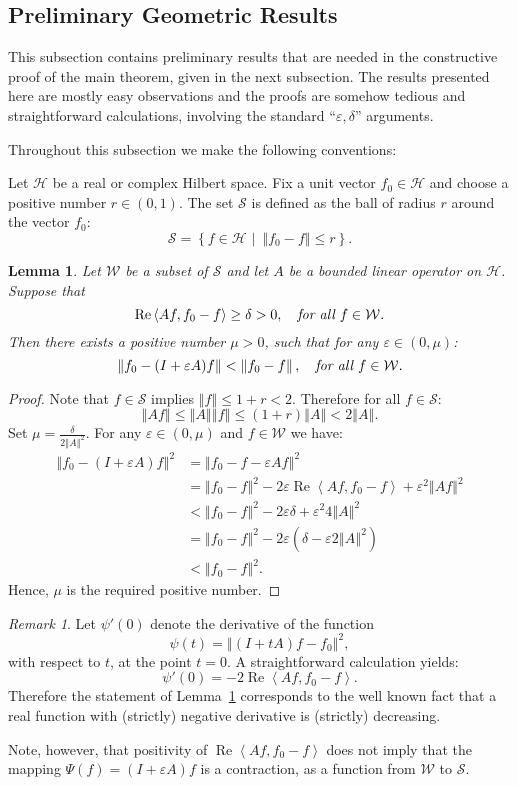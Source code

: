 \documentclass{tran-l}
\newtheorem{lem}[thm]{Lemma}
\theoremstyle{definition}
\theoremstyle{remark}
\newtheorem{rem}[thm]{Remark}
\numberwithin{equation}{subsection}
\DeclareMathOperator{\RE}{Re}
\newcommand{\eps}{\varepsilon}
\newcommand{\h}{\mathcal{H}}
\newcommand{\s}{\mathcal{S}}
\newcommand{\W}{\mathcal{W}}
\newcommand{\set}[1]{\left\{#1\right\}}
\newcommand{\seq}[1]{\left<#1\right>}
\newcommand{\norm}[1]{\left\Vert#1\right\Vert}
\begin{document}
\subsection{Preliminary Geometric Results}
This subsection contains preliminary results that are needed in the constructive proof of the main theorem, given in the next subsection. The results presented here are mostly easy observations and the proofs are somehow tedious and straightforward calculations, involving the standard ``$\eps,\delta$'' arguments.

Throughout this subsection we make the following conventions:

Let $\h$ be a real or complex Hilbert space. Fix a unit vector $f_0\in\h$ and choose a positive number $r\in(0,1)$. The set $\s$ is defined as the ball of radius $r$ around the vector $f_0$:
\[ \s = \set{f\in\h\,\,|\,\,\, \norm{f_0-f}\leq r}. \]

\begin{lem} \label{l:APPROX}
Let $\W$ be a subset of $\s$ and let $A$ be a bounded linear operator on $\h$. Suppose that
\[ \RE\seq{A{f},f_0-f}\geq\delta>0,
   \quad \text{\em for all $f\in\W$.} \]
Then there exists a positive number $\mu>0$, such that for any $\eps\in(0,\mu)$:
\[ \norm{f_0 - (I+\eps A)f} < \norm{f_0 - f},
   \quad \text{\em for all $f\in\W$.} \]
\end{lem}

\begin{proof}
Note that $f\in\s$ implies $\norm{f} \leq 1 + r < 2$. Therefore for all $f\in\s$:
\[ \norm{A{f}} \leq \norm{A}\norm{f} \leq (1+r) \norm{A} < 2\norm{A}. \]
Set $\mu=\tfrac{\delta}{2\norm{A}^2}$. For any $\eps\in(0,\mu)$ and $f\in\W$ we have:
\begin{align*}
  \norm{f_0 - (I+\eps A)f}^2 &= \norm{f_0-f - \eps A f}^2 \\ & =
  \norm{f_0-f}^2 - 2\eps\RE\seq{A{f},f_0-f} + \eps^2\norm{A{f}}^2 \\
  & < \norm{f_0-f}^2 - 2\eps\delta + \eps^2 4\norm{A}^2 \\ & =
  \norm{f_0-f}^2 - 2\eps(\delta - \eps 2\norm{A}^2) \\ & <
  \norm{f_0-f}^2.
\end{align*}
Hence, $\mu$ is the required positive number.
\end{proof}

\begin{rem}
Let $\psi'(0)$ denote the derivative of the function
\[ \psi(t)=\norm{(I+t{A})f-f_0}^2, \]
with respect to $t$, at the point $t=0$. A straightforward calculation yields:
\[ \psi'(0)=-2\RE\seq{A{f},f_0-f}. \]
Therefore the statement of Lemma~\ref{l:APPROX} corresponds to the well known fact that a real function with (strictly) negative derivative is (strictly) decreasing.

Note, however, that positivity of $\RE\seq{A{f},f_0-f}$ does not imply that the mapping $\Psi(f)=(I+\eps A)f$ is a contraction, as a function from $\W$ to $\s$.
\end{rem}
\end{document}
